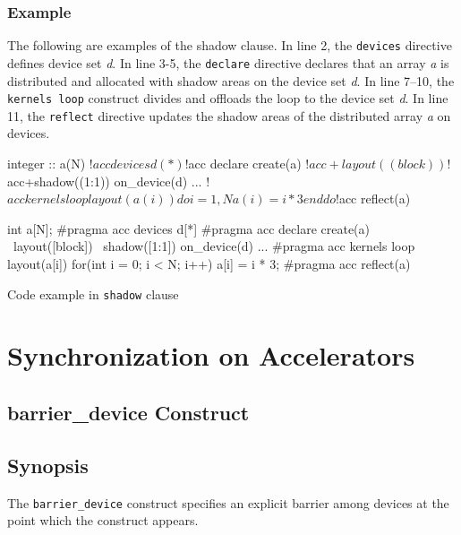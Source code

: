 \subsubsection*{Example}
The following are examples of the shadow clause.
In line 2, the {\tt devices} directive defines device set {\it d}.
In line 3-5, the {\tt declare} directive declares that an array {\it a} is distributed and allocated with shadow areas on the device set {\it d}.
In line 7--10, the {\tt kernels loop} construct divides and offloads the loop to the device set {\it d}.
In line 11, the {\tt reflect} directive updates the shadow areas of the distributed array {\it a} on devices.
%
\begin{myfigure}
\begin{minipage}{0.47\hsize}
\begin{center}
\begin{XACCFexampleL}
integer :: a(N)
!$acc devices d(*)
!$acc declare create(a)
!$acc+layout((block))
!$acc+shadow((1:1)) on_device(d)
...
!$acc kernels loop layout(a(i))
do i = 1, N
  a(i) = i * 3
end do
!$acc reflect(a)
\end{XACCFexampleL}
\end{center}
\end{minipage}
%
\begin{minipage}{0.48\hsize}
\begin{center}
\begin{XACCCexampleR}
int a[N];
#pragma acc devices d[*]
#pragma acc declare create(a) \
        layout([block]) \
        shadow([1:1]) on_device(d)
...
#pragma acc kernels loop layout(a[i])
for(int i = 0; i < N; i++){
  a[i] = i * 3;
}
#pragma acc reflect(a)
\end{XACCCexampleR}
\end{center}
\end{minipage}
\caption{Code example in {\XACC} {\tt shadow} clause}\label{code:shadow_clause}
\end{myfigure}


\section{Synchronization on Accelerators}
\subsection{barrier\_device Construct}
\subsection*{Synopsis}
The {\tt barrier\_device} construct specifies an explicit barrier among devices at the point which the construct appears.

